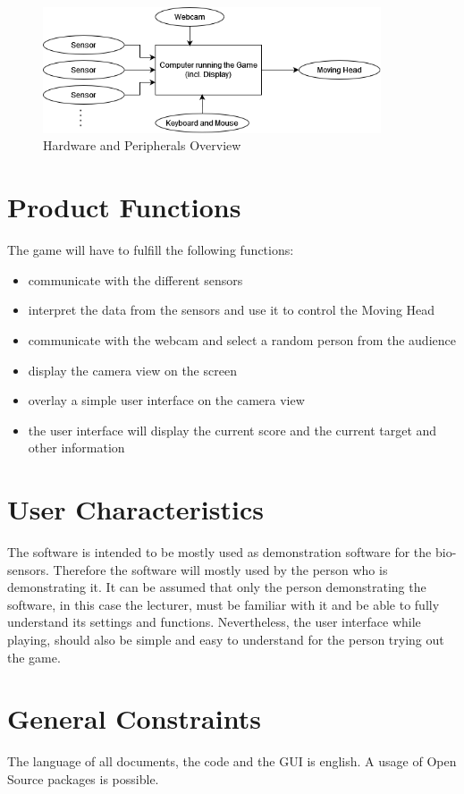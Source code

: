 \documentclass[a4paper]{scrreprt}
\begin{document}
\begin{figure}[H]
	\includegraphics[width=10cm]{hardware_and_peripherals}
	\centering
	\caption{Hardware and Peripherals Overview}
	\centering
	\label{fig:brainbodycomputerinterface}
\end{figure}

\section{Product Functions}
The game will have to fulfill the following functions:
\begin{itemize}
	\item communicate with the different sensors
	\item interpret the data from the sensors and use it to control the Moving Head
	\item communicate with the webcam and select a random person from the audience
	\item display the camera view on the screen
	\item overlay a simple user interface on the camera view
	\item the user interface will display the current score and the current target and other information
\end{itemize}

\section{User Characteristics}
The software is intended to be mostly used as demonstration software for the bio-sensors.
Therefore the software will mostly used by the person who is demonstrating it.
It can be assumed that only the person demonstrating the software, in this case the lecturer, 
must be familiar with it and be able to fully understand its settings and functions.
Nevertheless, the user interface while playing, should also be simple and easy to understand for the person trying out the game.

\section{General Constraints}
The language of all documents, the code and the GUI is english. A usage of Open Source
packages is possible.
\end{document}
